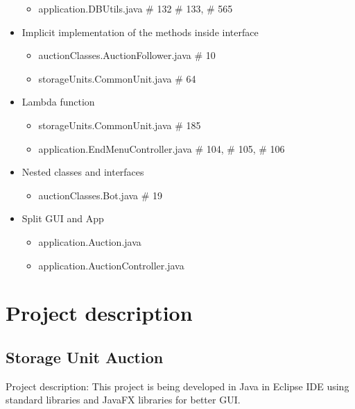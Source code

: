 \documentclass[
]{report}
\providecommand{\tightlist}{%
  \setlength{\itemsep}{0pt}\setlength{\parskip}{0pt}}
\begin{document}
\begin{itemize}
  \begin{itemize}
  \tightlist
  \item
    application.DBUtils.java \# 132 \# 133, \# 565
  \end{itemize}
\item
  Implicit implementation of the methods inside interface

  \begin{itemize}
  \tightlist
  \item
    auctionClasses.AuctionFollower.java \# 10
  \item
    storageUnits.CommonUnit.java \# 64
  \end{itemize}
\item
  Lambda function

  \begin{itemize}
  \tightlist
  \item
    storageUnits.CommonUnit.java \# 185
  \item
    application.EndMenuController.java \# 104, \# 105, \# 106
  \end{itemize}
\item
  Nested classes and interfaces

  \begin{itemize}
  \tightlist
  \item
    auctionClasses.Bot.java \# 19
  \end{itemize}
\item
  Split GUI and App

  \begin{itemize}
  \tightlist
  \item
    application.Auction.java
  \item
    application.AuctionController.java
  \end{itemize}
\end{itemize}

\hypertarget{project-description}{%
\chapter{Project description}\label{project-description}}

\hypertarget{storage-unit-auction}{%
\section{Storage Unit Auction}\label{storage-unit-auction}}

Project description: This project is being developed in Java in Eclipse
IDE using standard libraries and JavaFX libraries for better GUI.
\end{document}
